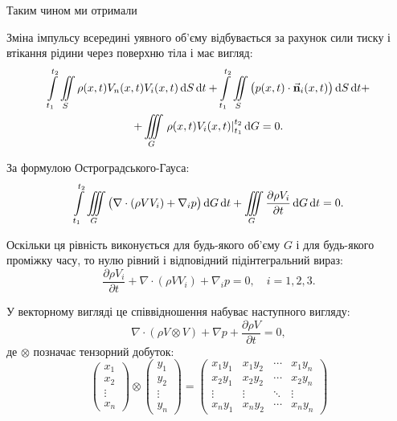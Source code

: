 Таким чином ми отримали
\begin{law}
	\label{law:impulse-conservation}
	Зміна імпульсу всередині уявного об'єму відбувається за рахунок сили тиску і втікання рідини через поверхню тіла і має вигляд:
	\begin{multline}
	\displaystyle\int\limits_{t_1}^{t_2} \displaystyle\iint\limits_S \rho(x, t) V_n(x, t) V_i(x, t) \mathop{}\!\mathrm{d} S \mathop{}\!\mathrm{d} t+\displaystyle\int\limits_{t_1}^{t_2} \displaystyle\iint\limits_S \big( p(x, t) \cdot \vec{\textbf{n}}_i(x, t) \big) \mathop{}\!\mathrm{d} S \mathop{}\!\mathrm{d} t +\\
	+	 \displaystyle\iiint\limits_G \left. \rho(x, t) V_i(x, t) \right|_{t_1}^{t_2} \mathop{}\!\mathrm{d} G = 0.
	\end{multline}
\end{law}

За формулою Остроградського-Гауса:
\begin{equation}
	\displaystyle\int\limits_{t_1}^{t_2} \displaystyle\iiint\limits_G \big( \nabla \cdot (\rho V V_i) + \nabla_i p \big) \mathop{}\!\mathrm{d} G \mathop{}\!\mathrm{d} t + \displaystyle\iiint\limits_G \frac{\partial \rho V_i}{\partial t}\mathop{}\!\mathrm{d} G \mathop{}\!\mathrm{d} t = 0.
\end{equation}

Оскільки ця рівність виконується для будь-якого об'єму $G$ і для будь-якого проміжку часу, то нулю рівний і відповідний підінтегральний вираз:
\begin{equation}
\frac{\partial \rho V_i}{\partial t} +	\nabla \cdot (\rho V V_i) + \nabla_i p = 0, \quad i = 1, 2, 3.
\end{equation}

У векторному вигляді це співвідношення набуває наступного вигляду:
\begin{equation}
	\nabla \cdot (\rho V \otimes V) + \nabla p + \frac{\partial \rho V}{\partial t} = 0,
\end{equation}
де $\otimes$ позначає тензорний добуток:
\begin{equation}
	\begin{pmatrix}
		x_1 \\
		x_2 \\
		\vdots \\
		x_n
	\end{pmatrix} 
	\otimes
	\begin{pmatrix}
		y_1 \\
		y_2 \\
		\vdots \\
		y_n
	\end{pmatrix} 
	=
	\begin{pmatrix}
		x_1 y_1 & x_1 y_2 & \cdots & x_1 y_n \\
		x_2 y_1 & x_2 y_2 & \cdots & x_2 y_n \\
		\vdots & \vdots & \ddots & \vdots \\
		x_n y_1 & x_n y_2 & \cdots & x_n y_n
	\end{pmatrix}
\end{equation}

